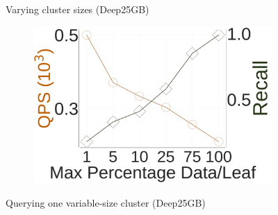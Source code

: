 \begin{figure}[tb]
\begin{minipage}{0.295\columnwidth}
\begin{subfigure}{\columnwidth}
		\end{subfigure} 
		\caption{{Varying cluster sizes (Deep25GB)}}
		\label{fig:elpis:design:cluster-size}
	\end{minipage}	
	\begin{minipage}{0.34\columnwidth}				
		\vspace{.05in}
		\begin{subfigure}{\columnwidth}
		\captionsetup{justification=centering}	
			\includegraphics[width=\columnwidth]{../img/elpis/Idx/25_dpl_qps.pdf} 
		\end{subfigure}	
		\caption{{Querying one variable-size cluster (Deep25GB)}}
		\label{fig:elpis:design:cluster-size:errorestqps}
	\end{minipage}
\end{figure}


